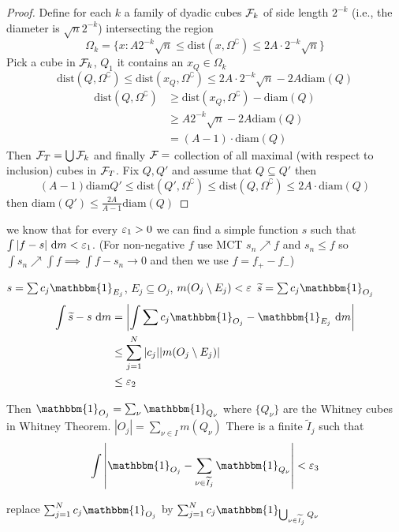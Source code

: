\begin{proof}
  Define for each $k$ a family of dyadic cubes $\mathcal F_k$ of side length $2^{-k}$ 
  (i.e., the diameter is $\sqrt{n}2^{-k}$)
  intersecting the region 
  $$\Omega_k = \{x : A2^{-k}\sqrt{n} \le \mathrm{dist}(x, \Omega^\complement) \le 2A \cdot 2^{-k}\sqrt{n}\}$$
  Pick a cube in $\mathcal F_k$, $Q_1$ it contains an $x_Q \in \Omega_k$
  $$\mathrm{dist}(Q, \Omega^\complement) \le \mathrm{dist}(x_Q, \Omega^\complement)\le 2A \cdot 2^{-k} \sqrt{n} - 2A \mathrm{diam}(Q)$$
  \begin{align*}
    \mathrm{dist}(Q, \Omega^\complement) &\ge \mathrm{dist}(x_Q, \Omega^\complement) - \mathrm{diam}(Q) \\
    &\ge A2^{-k}\sqrt{n} - 2A \mathrm{diam}(Q) \\
    &= (A-1)\cdot \mathrm{diam}(Q)
  \end{align*}
  Then $\mathcal F_T = \bigcup \mathcal F_k$ and finally $\mathcal F = $ collection of all maximal (with respect to inclusion) cubes in $\mathcal F_T$.
  Fix $Q, Q'$ and assume that $Q \subseteq Q'$ then
  $$(A-1)\mathrm{diam}Q' \le \mathrm{dist}(Q', \Omega^\complement) \le \mathrm{dist}(Q, \Omega^\complement)\le 2A\cdot \mathrm{diam}(Q)$$
  then $\mathrm{diam}(Q') \le \frac{2A}{A-1}\mathrm{diam}(Q)$
\end{proof}

we know that for every $\varepsilon_1 > 0$ we can find a simple function $s$ such that $\int |f - s| \ \mathrm{d}m < \varepsilon_1$.
(For non-negative $f$ use MCT $s_n \nearrow f$ and $s_n \le f$ so $\int s_n \nearrow \int f\implies \int f - s_n \to 0$ and then we use $f = f_+ - f_-$)

$s = \sum c_j \mathbbm{1}_{E_j}$, $E_j \subseteq O_j$, $m(O_j \setminus E_j)<\varepsilon$ 
$\widetilde{s} = \sum c_j  \mathbbm{1}_{O_j}$
\begin{align*}
  \int \widetilde{s} - s \ \mathrm{d}m &= \left|\int \sum c_j \mathbbm{1}_{O_j}-\mathbbm{1}_{E_j} \ \mathrm{d}m\right| \\
  &\leq \sum_{j=1}^N |c_j||m(O_j \setminus E_j)| \\
  &\leq \eps_2
\end{align*}

Then $\mathbbm{1}_{O_j} = \sum_\nu \mathbbm{1}_{Q_{\nu}}$ where $\{Q_{\nu}\}$ are the Whitney cubes in Whitney Theorem.
$|O_j| = \sum_{\nu \in I} m(Q_{\nu})$
There is a finite $\widetilde{I}_j$ such that 
\[\int \left|\mathbbm{1}_{O_j} - \sum_{\nu \in \widetilde{I}_j} \mathbbm{1}_{Q_\nu}\right| < \eps_3\]

replace $\sum_{j=1}^N c_j \mathbbm{1}_{O_j}$ by $\sum_{j=1}^N c_j \mathbbm{1}_{\bigcup_{\nu \in \widetilde{I}_j}Q_\nu }$


